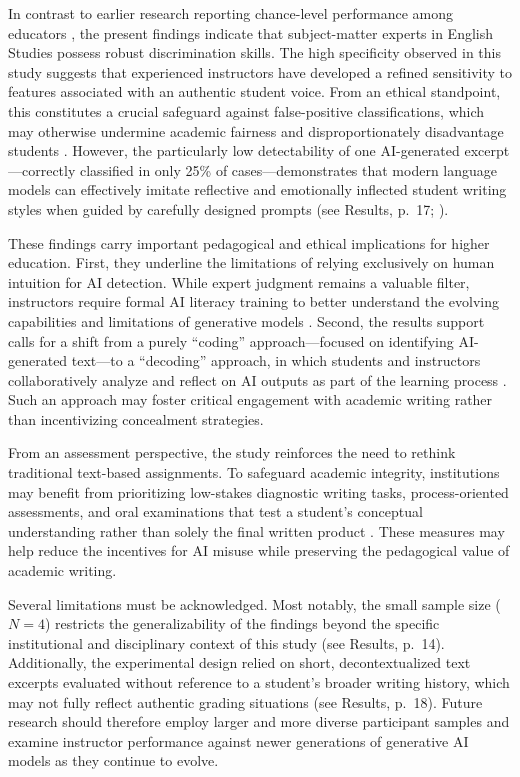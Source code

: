 \documentclass[12pt]{article}
\begin{document}
In contrast to earlier research reporting chance-level performance among educators \autocite[1]{fleckenstein_teachers_2024}, the present findings indicate that subject-matter experts in English Studies possess robust discrimination skills. The high specificity observed in this study suggests that experienced instructors have developed a refined sensitivity to features associated with an authentic student voice. From an ethical standpoint, this constitutes a crucial safeguard against false-positive classifications, which may otherwise undermine academic fairness and disproportionately disadvantage students \autocite[11]{deriba_fairness_2025}. However, the particularly low detectability of one AI-generated excerpt—correctly classified in only 25\% of cases—demonstrates that modern language models can effectively imitate reflective and emotionally inflected student writing styles when guided by carefully designed prompts (see Results, p.~17; \autocite[10]{chaka_detecting_2023}).

These findings carry important pedagogical and ethical implications for higher education. First, they underline the limitations of relying exclusively on human intuition for AI detection. While expert judgment remains a valuable filter, instructors require formal AI literacy training to better understand the evolving capabilities and limitations of generative models \autocites[426]{orhani_risks_2025}[109]{kumar_ai_2025}. Second, the results support calls for a shift from a purely “coding” approach—focused on identifying AI-generated text—to a “decoding” approach, in which students and instructors collaboratively analyze and reflect on AI outputs as part of the learning process \autocite[188]{rahimi_ai_2025}. Such an approach may foster critical engagement with academic writing rather than incentivizing concealment strategies.

From an assessment perspective, the study reinforces the need to rethink traditional text-based assignments. To safeguard academic integrity, institutions may benefit from prioritizing low-stakes diagnostic writing tasks, process-oriented assessments, and oral examinations that test a student’s conceptual understanding rather than solely the final written product \autocites[51]{fleckenstein_teachers_2024}[521]{orhani_risks_2025}. These measures may help reduce the incentives for AI misuse while preserving the pedagogical value of academic writing.

Several limitations must be acknowledged. Most notably, the small sample size ($N = 4$) restricts the generalizability of the findings beyond the specific institutional and disciplinary context of this study (see Results, p.~14). Additionally, the experimental design relied on short, decontextualized text excerpts evaluated without reference to a student’s broader writing history, which may not fully reflect authentic grading situations (see Results, p.~18). Future research should therefore employ larger and more diverse participant samples and examine instructor performance against newer generations of generative AI models as they continue to evolve.
\end{document}
